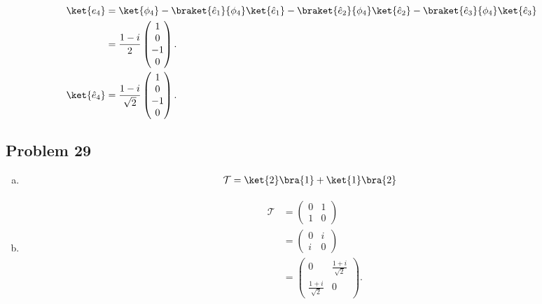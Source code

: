 \documentclass[10pt]{mypackage}
\begin{document}
\begin{align*}
  \\
  \ket{e_4} &= \ket{\phi_4} - \braket{\hat{e}_1}{\phi_4}\ket{\hat{e}_1} - \braket{\hat{e}_2}{\phi_4}\ket{\hat{e}_2} - \braket{\hat{e}_3}{\phi_4}\ket{\hat{e}_3}\\
            &= \frac{1-i}{2} \begin{pmatrix}1\\0\\-1\\0\end{pmatrix}.\\
  \ket{\hat{e}_4} &= \frac{1-i}{\sqrt{2}} \begin{pmatrix}1\\0\\-1\\0\end{pmatrix}.
\end{align*}

\subsection{Problem 29}%
\begin{enumerate}[(a)]
  \item 
    \begin{align*}
      \mathcal{T} &= \ket{2}\bra{1} + \ket{1}\bra{2}
    \end{align*}
  \item 
    \begin{align*}
      \mathcal{T} &= \begin{pmatrix}0 & 1 \\ 1 & 0\end{pmatrix}\\
                  &= \begin{pmatrix}0 & i \\ i & 0\end{pmatrix}\\
                  &= \begin{pmatrix}0 & \frac{1+i}{\sqrt{2}} \\  \frac{1+i}{\sqrt{2}} & 0 \end{pmatrix}.
    \end{align*}
\end{enumerate}
\end{document}
